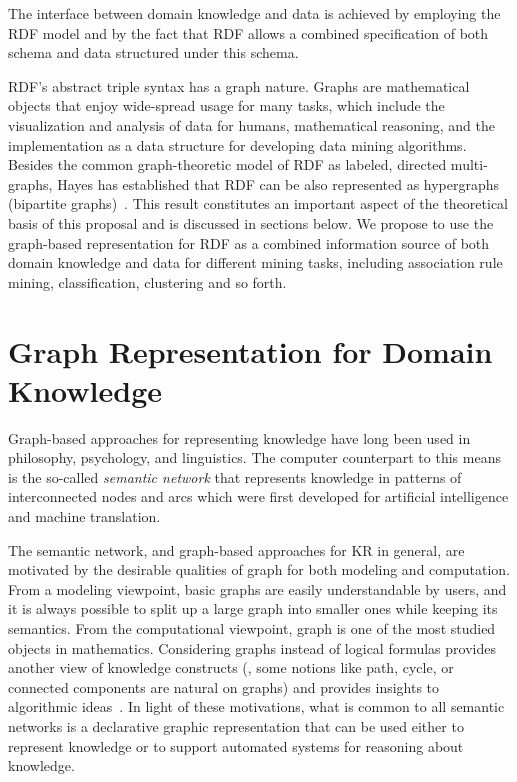 The interface between domain knowledge and data is achieved by employing the RDF model and by the fact that RDF allows a combined specification of both schema and data structured under this schema.

RDF's abstract triple syntax has a graph nature. Graphs are mathematical objects that enjoy wide-spread usage for many tasks, which include the visualization and analysis of data for humans, mathematical reasoning, and the implementation as a data structure for developing data mining algorithms. Besides the common graph-theoretic model of RDF as labeled, directed multi-graphs, Hayes has established that RDF can be also represented as hypergraphs (bipartite graphs)~\cite{GraphModelRDF}. This result constitutes an important aspect of the theoretical basis of this proposal and is discussed in sections below. We propose to use the graph-based representation for RDF as a combined information source of both domain knowledge and data for different mining tasks, including association rule mining, classification, clustering and so forth.

\section{Graph Representation for Domain Knowledge}
Graph-based approaches for representing knowledge have long been used in philosophy, psychology, and linguistics. The computer counterpart to this means is the so-called \emph{semantic network} that represents knowledge in patterns of interconnected nodes and arcs which were first developed for artificial intelligence and machine translation.

The semantic network, and graph-based approaches for KR in general, are motivated by the desirable qualities of graph for both modeling and computation. From a modeling viewpoint, basic graphs are easily understandable by users, and it is always possible to split up a large graph into smaller ones while keeping its semantics. From the computational viewpoint, graph is one of the most studied objects in mathematics. Considering graphs instead of logical formulas provides another view of knowledge constructs (\eg, some notions like path, cycle, or connected components are natural on graphs) and provides insights to algorithmic ideas~\cite{CheinMugnier08}. In light of these motivations, what is common to all semantic networks is a declarative graphic representation that can be used either to represent knowledge or to support automated systems for reasoning about knowledge.

